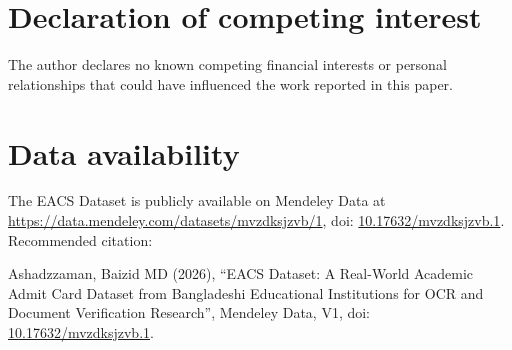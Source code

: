 \documentclass[a4paper,fleqn]{cas-dc}
\newcommand{\datasetdoiurl}{\href{https://doi.org/10.17632/mvzdksjzvb.1}{10.17632/mvzdksjzvb.1}}
\newcommand{\dataseturl}{\url{https://data.mendeley.com/datasets/mvzdksjzvb/1}}
\begin{document}
\section*{Declaration of competing interest}

The author declares no known competing financial interests or personal
relationships that could have influenced the work reported in this paper.

\section*{Data availability}

The EACS Dataset is publicly available on Mendeley Data at \dataseturl,
doi: \datasetdoiurl. Recommended citation:

\begingroup
\raggedright
Ashadzzaman, Baizid MD (2026), ``EACS Dataset: A Real-World Academic Admit
Card Dataset from Bangladeshi Educational Institutions for OCR and Document
Verification Research'', Mendeley Data, V1, doi: \datasetdoiurl.
\par
\endgroup

\printcredits



\end{document}
